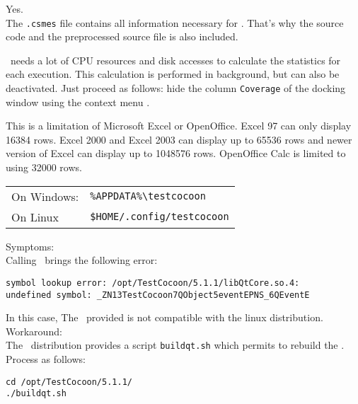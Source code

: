 Yes.\\
The \verb$.csmes$ file contains all information necessary for \CoverageBrowser.
That's why the source code and the preprocessed source file is also included.

\chapterHTMLnonu{\CoverageBrowser}


\CoverageBrowser\ needs a lot of CPU resources and disk accesses to calculate the statistics for each execution.
This calculation is performed in background, but can also be deactivated.
Just proceed as follows:
 hide the column \verb$Coverage$ of the docking window  using the context menu .


This is a limitation of Microsoft Excel or OpenOffice.
Excel 97 can only display 16384 rows. Excel 2000 and Excel 2003 can display up to 65536 rows and newer version of Excel can display up to 1048576 rows. OpenOffice Calc is limited to using 32000 rows.




\begin{tabular}{ll}
On Windows: & \verb$%APPDATA%\testcocoon$     \\ 
On Linux    & \verb?$HOME/.config/testcocoon? \\ 
\end{tabular}


Symptoms:\\
Calling \CoverageBrowser\ brings the following error:
\begin{verbatim}
symbol lookup error: /opt/TestCocoon/5.1.1/libQtCore.so.4: 
undefined symbol: _ZN13TestCocoon7QObject5eventEPNS_6QEventE
\end{verbatim}
In this case, The \QtLibrary\ provided is not compatible with the linux distribution.
Workaround:\\
The \TestCocoon\ distribution provides a script \verb$buildqt.sh$ which permits to rebuild the \QtLibrary.
Process as follows:\\
\begin{verbatim}
cd /opt/TestCocoon/5.1.1/
./buildqt.sh
\end{verbatim}

